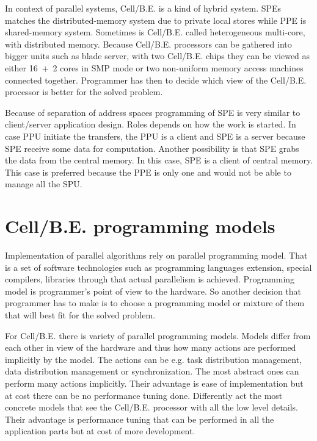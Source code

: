 In context of parallel systems, \mbox{Cell/B.E.} is a kind of hybrid system.
SPEs matches the distributed-memory system due to private local stores while PPE is shared-memory system.
Sometimes is \mbox{Cell/B.E.} called heterogeneous multi-core, with distributed memory.
Because \mbox{Cell/B.E.} processors can be gathered into bigger units such as blade server, with two \mbox{Cell/B.E.} chips they can be viewed as either \mbox{16 + 2} cores in SMP mode or two non-uniform memory access machines connected together.
Programmer has then to decide which view of the \mbox{Cell/B.E.} processor is better for the solved problem.

\par
Because of separation of address spaces programming of SPE is very similar to client/server application design.
Roles depends on how the work is started.
In case PPU initiate the transfers, the PPU is a client and SPE is a server because SPE receive some data for computation.
Another possibility is that SPE grabs the data from the central memory.
In this case, SPE is a client of central memory.
This case is preferred because the PPE is only one and would not be able to manage all the SPU.

\section{\mbox{Cell/B.E.} programming models}

\par
Implementation of parallel algorithms rely on parallel programming model.
That is a set of software technologies such as programming languages extension, special compilers, libraries through that actual parallelism is achieved.
Programming model is programmer's point of view to the hardware.
So another decision that programmer has to make is to choose a programming model or mixture of them that will best fit for the solved problem.

\par
For \mbox{Cell/B.E.} there is variety of parallel programming models.
Models differ from each other in view of the hardware and thus how many actions are performed implicitly by the model.
The actions can be e.g. task distribution management, data distribution management or synchronization.
The most abstract ones can perform many actions implicitly.
Their advantage is ease of implementation but at cost there can be no performance tuning done.
Differently act the most concrete models that see the \mbox{Cell/B.E.} processor with all the low level details.
Their advantage is performance tuning that can be performed in all the application parts but at cost of more development.

